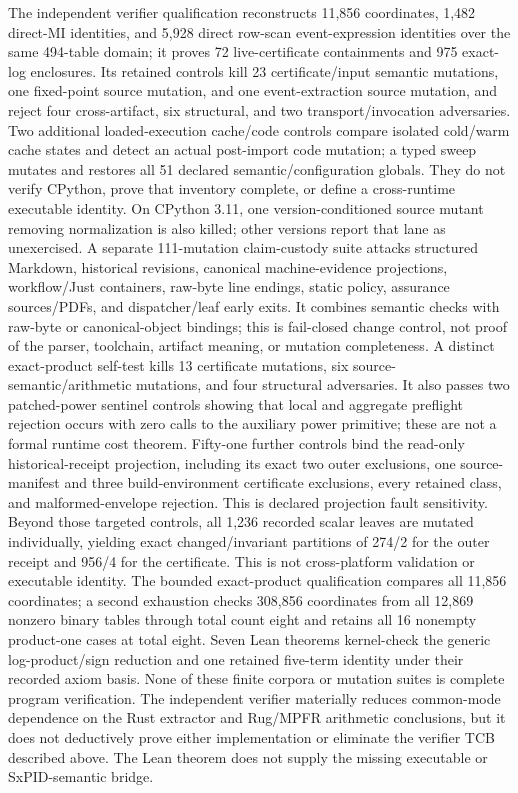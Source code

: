 \documentclass[11pt]{article}
\begin{document}
The independent verifier qualification reconstructs 11,856 coordinates, 1,482 direct-MI
identities, and 5,928 direct row-scan event-expression identities over the same 494-table domain;
it proves 72 live-certificate containments and 975 exact- log enclosures.  Its
retained controls kill 23 certificate/input semantic mutations, one fixed-point source mutation,
and one event-extraction source mutation, and reject four cross-artifact, six structural, and two
transport/invocation adversaries.  Two additional loaded-execution cache/code controls compare
isolated cold/warm cache states and detect an actual post-import code mutation; a typed sweep
mutates and restores all 51 declared semantic/configuration globals.  They do not verify CPython,
prove that inventory complete, or define a cross-runtime executable identity.  On CPython 3.11,
one version-conditioned source mutant removing normalization is also killed;
other versions report that lane as unexercised.  A separate 111-mutation claim-custody suite
attacks structured Markdown, historical revisions, canonical machine-evidence projections,
workflow/Just containers, raw-byte line endings, static policy, assurance sources/PDFs, and
dispatcher/leaf early exits.  It combines semantic checks with raw-byte or canonical-object
bindings; this is fail-closed change control, not proof of the parser, toolchain, artifact
meaning, or mutation completeness.  A distinct exact-product self-test kills 13 certificate
mutations, six source-semantic/arithmetic mutations, and four structural adversaries.  It also
passes two patched-power sentinel controls showing that local and aggregate preflight rejection
occurs with zero calls to the auxiliary power primitive; these are not a formal runtime cost
theorem.  Fifty-one further controls bind the read-only historical-receipt projection, including
its exact two outer exclusions, one source-manifest and three build-environment certificate
exclusions, every retained class, and malformed-envelope rejection.  This is declared projection
fault sensitivity.  Beyond those targeted controls, all 1,236 recorded scalar leaves are mutated
individually, yielding exact changed/invariant partitions of 274/2 for the outer receipt and
956/4 for the certificate.  This is not cross-platform validation or executable identity.  The bounded
exact-product qualification compares all 11,856 coordinates; a second exhaustion checks 308,856
coordinates from all 12,869 nonzero binary tables through total count eight and retains all 16
nonempty product-one cases at total eight.  Seven Lean theorems kernel-check the generic
log-product/sign reduction and one retained five-term identity under their recorded axiom basis.
None of these finite corpora or mutation suites is complete program verification.  The independent
verifier materially reduces common-mode dependence on the Rust extractor and Rug/MPFR arithmetic
conclusions, but it does not deductively prove either implementation or eliminate the verifier TCB
described above.  The Lean theorem does not supply the missing executable or SxPID-semantic bridge.
\end{document}
